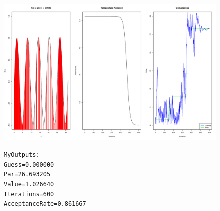 \documentclass{article}
\begin{document}
\begin{figure}
	\begin{center}
		\begin{minipage}[h!]{0.8\textwidth}
			\includegraphics[width=1.0\textwidth]{simPic1.pdf}
		\end{minipage}
		\begin{minipage}[h!]{0.19\textwidth}
			\begin{alltt}
			My Outputs:
			Guess           = 0.000000
			Par             = 26.693205
			Value           = 1.026640
			Iterations      = 600
			Acceptance Rate = 0.861667	
			\end{alltt}
		\end{minipage}
	\end{center}
\end{figure}

\clearpage
\end{document}
